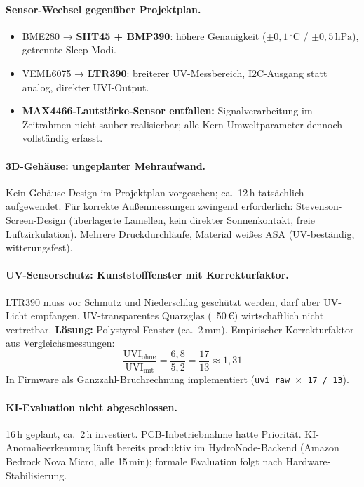 \documentclass[11pt,a4paper]{scrartcl}
\begin{document}
\paragraph{Sensor-Wechsel gegenüber Projektplan.}
\begin{itemize}
  \item BME280 → \textbf{SHT45 + BMP390}: höhere Genauigkeit ($\pm0{,}1\,^\circ$C / $\pm0{,}5\,\text{hPa}$), getrennte Sleep-Modi.
  \item VEML6075 → \textbf{LTR390}: breiterer UV-Messbereich, I2C-Ausgang statt analog, direkter UVI-Output.
  \item \textbf{MAX4466-Lautstärke-Sensor entfallen:} Signalverarbeitung im Zeitrahmen nicht sauber realisierbar; alle Kern-Umweltparameter dennoch vollständig erfasst.
\end{itemize}

\paragraph{3D-Gehäuse: ungeplanter Mehraufwand.}
Kein Gehäuse-Design im Projektplan vorgesehen; ca.~12\,h tatsächlich aufgewendet. Für korrekte Außenmessungen zwingend erforderlich: Stevenson-Screen-Design (überlagerte Lamellen, kein direkter Sonnenkontakt, freie Luftzirkulation). Mehrere Druckdurchläufe, Material weißes ASA (UV-beständig, witterungsfest).

\paragraph{UV-Sensorschutz: Kunststofffenster mit Korrekturfaktor.}
LTR390 muss vor Schmutz und Niederschlag geschützt werden, darf aber UV-Licht empfangen. UV-transparentes Quarzglas (~50\,€) wirtschaftlich nicht vertretbar. \textbf{Lösung:} Polystyrol-Fenster (ca.~2\,mm). Empirischer Korrekturfaktor aus Vergleichsmessungen:
\[ \frac{\text{UVI}_{\text{ohne}}}{\text{UVI}_{\text{mit}}} = \frac{6{,}8}{5{,}2} = \frac{17}{13} \approx 1{,}31 \]
In Firmware als Ganzzahl-Bruchrechnung implementiert (\texttt{uvi\_raw $\times$ 17 / 13}).

\paragraph{KI-Evaluation nicht abgeschlossen.}
16\,h geplant, ca.~2\,h investiert. PCB-Inbetriebnahme hatte Priorität. KI-Anomalieerkennung läuft bereits produktiv im HydroNode-Backend (Amazon Bedrock Nova Micro, alle 15\,min); formale Evaluation folgt nach Hardware-Stabilisierung.
\end{document}
